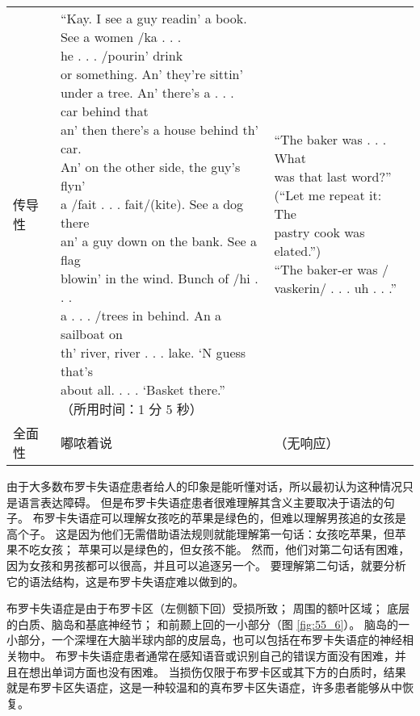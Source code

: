 \begin{table}[htbp]
\begin{tabular}{lll}
		传导性 & \makecell[l]{“Kay. I see a guy readin’ a book. \\See a women /ka . . . \\he . . . /pourin’ drink \\ or something. An’ they’re sittin’ \\under a tree. An’ there’s a . . . \\car behind that \\ an’ then there’s a house behind th’ car. \\An’ on the other side, the guy’s flyn’ \\ a /fait . . . fait/(kite). See a dog there \\an’ a guy down on the bank. See a flag \\ blowin’ in the wind. Bunch of /hi . . . \\a . . . /trees in behind. An a sailboat on \\ th’ river, river . . . lake. ‘N guess that’s \\about all. . . . ‘Basket there.” \\（所用时间：1 分 5 秒）} & \makecell{“The baker was . . . What \\ was that last word?” \\ (“Let me repeat it: The \\ pastry cook was elated.”) \\ 	“The baker-er was / \\ vaskerin/ . . . uh . . .”} \\
		全面性 & 嘟哝着说 & （无响应） \\
		\bottomrule
	\end{tabular}
\end{table}


由于大多数布罗卡失语症患者给人的印象是能听懂对话，所以最初认为这种情况只是语言表达障碍。
但是布罗卡失语症患者很难理解其含义主要取决于语法的句子。
布罗卡失语症可以理解女孩吃的苹果是绿色的，但难以理解男孩追的女孩是高个子。
这是因为他们无需借助语法规则就能理解第一句话：女孩吃苹果，但苹果不吃女孩；
苹果可以是绿色的，但女孩不能。
然而，他们对第二句话有困难，因为女孩和男孩都可以很高，并且可以追逐另一个。
要理解第二句话，就要分析它的语法结构，这是布罗卡失语症难以做到的。


布罗卡失语症是由于布罗卡区（左侧额下回）受损所致； 周围的额叶区域； 底层的白质、脑岛和基底神经节； 和前颞上回的一小部分（图 \ref{fig:55_6}）。
脑岛的一小部分，一个深埋在大脑半球内部的皮层岛，也可以包括在布罗卡失语症的神经相关物中。
布罗卡失语症患者通常在感知语音或识别自己的错误方面没有困难，并且在想出单词方面也没有困难。
当损伤仅限于布罗卡区或其下方的白质时，结果就是布罗卡区失语症，这是一种较温和的真布罗卡区失语症，许多患者能够从中恢复。


